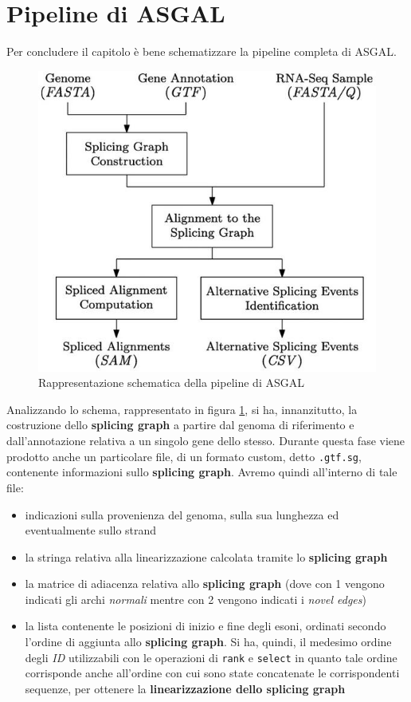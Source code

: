 \documentclass[a4paper,12pt, oneside]{book}
\begin{document}
\section{Pipeline di ASGAL}
Per concludere il capitolo è bene schematizzare la pipeline completa di ASGAL.
\begin{figure}
  \centering
  \includegraphics[scale = 0.5]{img/pipe.jpg}
  \caption{Rappresentazione schematica della pipeline di ASGAL \cite{denti}}
  \label{fig:pip}
\end{figure}
Analizzando lo schema, rappresentato in figura \ref{fig:pip}, si ha,
innanzitutto, la costruzione dello \textbf{splicing graph} a partire dal genoma
di riferimento e dall'annotazione relativa a un singolo gene dello
stesso. Durante questa fase viene prodotto anche un particolare file, di un
formato custom, detto \texttt{.gtf.sg}, contenente informazioni sullo
\textbf{splicing graph}. Avremo quindi all'interno di tale file: 
\begin{itemize}
  \item indicazioni sulla provenienza del genoma, sulla sua lunghezza ed
  eventualmente sullo strand
  \item la stringa relativa alla linearizzazione calcolata tramite lo
  \textbf{splicing graph}
  \item la matrice di adiacenza relativa allo \textbf{splicing graph} (dove con
  1 vengono indicati gli archi \textit{normali} mentre con 2 vengono indicati i
  \textit{novel edges})
  \item la lista contenente le posizioni di inizio e fine degli esoni, ordinati
  secondo l'ordine di aggiunta allo \textbf{splicing graph}. Si ha, quindi,
  il medesimo ordine degli \textit{ID} utilizzabili con le operazioni di
  \texttt{rank} e \texttt{select} in quanto tale ordine corrisponde anche
  all'ordine con cui sono state concatenate le corrispondenti sequenze, per
  ottenere la \textbf{linearizzazione dello splicing graph}
\end{itemize}
\end{document}

